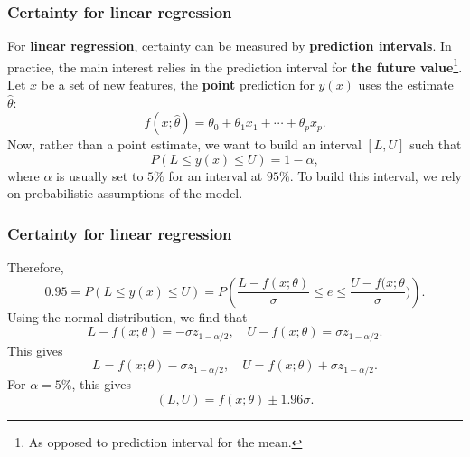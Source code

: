 \begin{frame}
\frametitle{Certainty for linear regression}
For {\bf linear regression}, certainty can be measured by {\bf prediction intervals}. In practice, the main interest relies in the prediction interval for {\bf the future value}\footnote{As opposed to prediction interval for the mean.}. \\
\vspace{0.3cm}
Let $x$ be a set of new features, the {\bf point} prediction for $y(x)$ uses the estimate $\hat{\theta}$:
$$
f(x;\hat{\theta}) = \theta_0 + \theta_1 x_1 + \cdots + \theta_p x_p.
$$
Now, rather than a point estimate, we want to build an interval $[L,U]$ such that 
$$
P(L \leq y(x) \leq U) = 1-\alpha,
$$
where $\alpha$ is usually set to $5\%$ for an interval at $95\%$. To build this interval, we rely on probabilistic assumptions of the model.
\end{frame}
\begin{frame}
\frametitle{Certainty for linear regression}
Therefore,
$$
0.95 = P(L \leq y(x) \leq U) = P\left(\frac{L-f(x;\theta)}{\sigma} \leq e \leq \frac{U-f(x;\theta}{\sigma})\right).
$$
Using the normal distribution, we find that
$$
L-f(x;\theta) = -\sigma z_{1-\alpha/2}, \quad U-f(x;\theta) = \sigma z_{1-\alpha/2}.
$$
This gives 
$$
L = f(x;\theta) -\sigma z_{1-\alpha/2}, \quad U = f(x;\theta) + \sigma z_{1-\alpha/2}.
$$
For $\alpha=5\%$, this gives
$$
(L,U) = f(x;\theta) \pm 1.96 \sigma.
$$
\end{frame}
